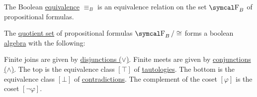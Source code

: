 \begin{proposition}\label{thm:boolean_equivalence_relation}
  The Boolean \hyperref[def:propositional_interpretation]{equivalence} \( \equiv_B \) is an equivalence relation on the set \( \CF_B \) of propositional formulas.
\end{proposition}

\begin{theorem}\label{thm:propositional_logic_boolean_algebra}
  The \hyperref[def:equivalence_relation]{quotient set} of propositional formulas \( \CF_B / \cong \) forms a boolean \hyperref[def:boolean_algebra]{algebra} with the following:
  \begin{ThmEnum}
     Finite joins are given by \hyperref[def:propositional_language/connectives/disjunction]{disjunctions (\( \vee \))}.
     Finite meets are given by \hyperref[def:propositional_language/connectives/conjunction]{conjunctions (\( \wedge \))}.
     The top is the equivalence class \( [\top] \) of \hyperref[def:propositional_interpretation/tautology]{tautologies}.
     The bottom is the equivalence class \( [\bot] \) of \hyperref[def:propositional_interpretation/contradiction]{contradictions}.
     The complement of the coset \( [\varphi] \) is the coset \hyperref[def:propositional_language/negation]{\( [\neg \varphi] \)}.
  \end{ThmEnum}
\end{theorem}
